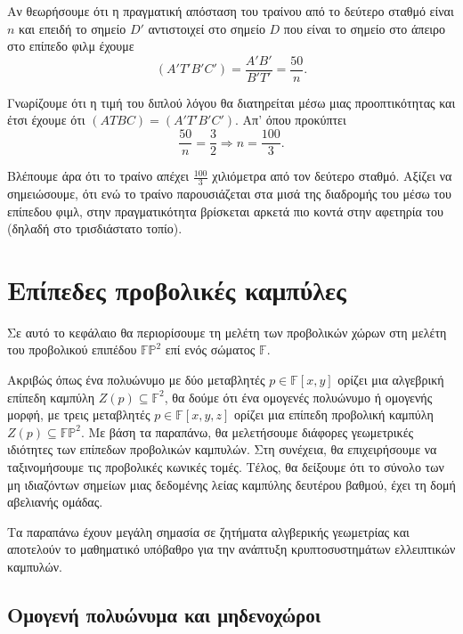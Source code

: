 \documentclass[12pt, a4paper]{book}
\begin{document}
Αν θεωρήσουμε ότι η πραγματική απόσταση του τραίνου από το δεύτερο σταθμό είναι $n$ και επειδή το σημείο $D'$ αντιστοιχεί στο σημείο $D$ που είναι το σημείο στο άπειρο στο επίπεδο φιλμ έχουμε
\begin{displaymath}
(A'T'B'C')=\frac{A'B'}{B'T'}=\frac{50}{n}.
\end{displaymath}

Γνωρίζουμε ότι η τιμή του διπλού λόγου θα διατηρείται μέσω μιας προοπτικότητας και έτσι έχουμε ότι $(ATBC)= (A'T'B'C')$. Απ' όπου προκύπτει
\begin{displaymath}
\frac{50}{n}=\frac{3}{2}\Rightarrow n = \frac{100}{3}.
\end{displaymath}

Βλέπουμε άρα ότι το τραίνο απέχει $\frac{100}{3}$ χιλιόμετρα από τον δεύτερο σταθμό. Αξίζει να σημειώσουμε, ότι ενώ το τραίνο παρουσιάζεται στα μισά της διαδρομής του μέσω του επίπεδου φιμλ, στην πραγματικότητα βρίσκεται αρκετά πιο κοντά στην αφετηρία του (δηλαδή στο τρισδιάστατο τοπίο).

\chapter{Επίπεδες προβολικές καμπύλες}

Σε αυτό το κεφάλαιο θα περιορίσουμε τη μελέτη των προβολικών χώρων στη μελέτη του προβολικού επιπέδου $\mathbb{F}\mathbb{P}^2$ επί ενός σώματος $\mathbb{F}$.

Ακριβώς όπως ένα πολυώνυμο με δύο μεταβλητές $p \in \mathbb{F}[x,y]$ ορίζει μια αλγεβρική επίπεδη καμπύλη $Z(p) \subseteq \mathbb{F}^2$, θα δούμε ότι ένα ομογενές πολυώνυμο ή ομογενής μορφή, με τρεις μεταβλητές $p \in \mathbb{F}[x,y,z]$ ορίζει μια επίπεδη προβολική καμπύλη $Z(p) \subseteq \mathbb{F}\mathbb{P}^2$. Με βάση τα παραπάνω, θα μελετήσουμε διάφορες γεωμετρικές ιδιότητες των επίπεδων προβολικών καμπυλών. Στη συνέχεια, θα επιχειρήσουμε να ταξινομήσουμε τις προβολικές κωνικές τομές. Τέλος, θα δείξουμε ότι το σύνολο των μη ιδιαζόντων σημείων μιας δεδομένης λείας καμπύλης δευτέρου βαθμού, έχει τη δομή αβελιανής ομάδας.

Τα παραπάνω έχουν μεγάλη σημασία σε ζητήματα αλγβερικής γεωμετρίας και αποτελούν το μαθηματικό υπόβαθρο για την ανάπτυξη κρυπτοσυστημάτων ελλειπτικών καμπυλών.

\section{Ομογενή πολυώνυμα και μηδενοχώροι}
\end{document}
